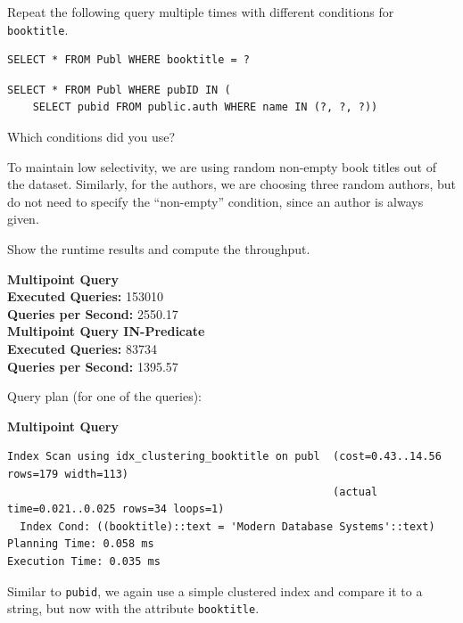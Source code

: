\documentclass[11pt]{scrartcl}
\begin{document}
Repeat the following query multiple times with different conditions for \texttt{booktitle}.

\begin{lstlisting}[style=dbtsql]
SELECT * FROM Publ WHERE booktitle = ?
\end{lstlisting}

\begin{lstlisting}[style=dbtsql]
SELECT * FROM Publ WHERE pubID IN (
    SELECT pubid FROM public.auth WHERE name IN (?, ?, ?))
\end{lstlisting}


Which conditions did you use?

To maintain low selectivity, we are using random non-empty book titles out of the dataset.
Similarly, for the authors, we are choosing three random authors, but do not need to specify the \enquote{non-empty}
condition, since an author is always given.

Show the runtime results and compute the throughput.

\textbf{Multipoint Query}\\
\textbf{Executed Queries: } 153010\\
\textbf{Queries per Second: } 2550.17 \\

\textbf{Multipoint Query IN-Predicate}\\
\textbf{Executed Queries: } 83734\\
\textbf{Queries per Second: } 1395.57

Query plan (for one of the queries):

\textbf{Multipoint Query}
{\small
\parskip0pt\begin{verbatim}
Index Scan using idx_clustering_booktitle on publ  (cost=0.43..14.56 rows=179 width=113)
                                                   (actual time=0.021..0.025 rows=34 loops=1)
  Index Cond: ((booktitle)::text = 'Modern Database Systems'::text)
Planning Time: 0.058 ms
Execution Time: 0.035 ms
\end{verbatim}}

Similar to \texttt{pubid}, we again use a simple clustered index and compare it to a string, but now with the attribute \texttt{booktitle}.
\end{document}
